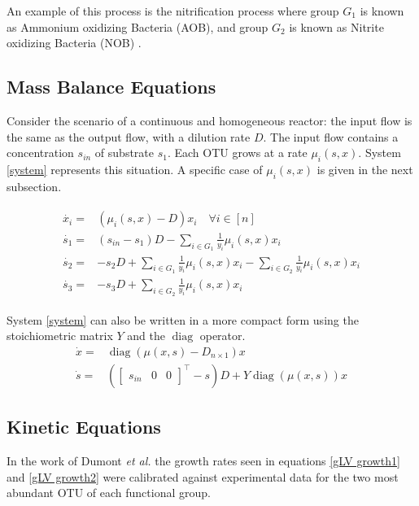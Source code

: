 \documentclass[3p,times]{article}
\DeclareMathOperator{\diag}{diag}
\begin{document}
An example of this process is the nitrification process where group $G_1$ is known as Ammonium oxidizing Bacteria (AOB), and group $G_2$ is known as Nitrite oxidizing Bacteria (NOB) \cite{SHARMA1977897}. 
\subsection{Mass Balance Equations}

Consider the scenario of a continuous and homogeneous reactor: the input flow is the same as the output flow, with a dilution rate $D$. The input flow contains a concentration $s_{in}$ of substrate $s_1$. Each OTU grows at a rate $\mu_i(s,x)$. System \eqref{system} represents this situation. A specific case of $\mu_i(s,x)$ is given in the next subsection. 

\begin{align} 
\label{system}
\begin{array}{cl}
\dot{x_i} =& \left(\mu_i(s,x) -D \right)x_i \quad \forall i \in [n] \\
\dot{s_1} =& \displaystyle (s_{in}-s_1)D - \sum\limits_{i\in G_1} \frac{1}{y_i} \mu_i(s,x) x_i  \\
\dot{s_2} = & \displaystyle -s_2D+\sum\limits_{i\in G_1} \frac{1}{y_i} \mu_i(s,x) x_i -\sum\limits_{i\in G_2} \frac{1}{y_i} \mu_i(s,x) x_i \\
\dot{s_3} =&  \displaystyle -s_3D+\sum\limits_{i\in G_2} \frac{1}{y_i} \mu_i(s,x) x_i  
\end{array}
\end{align}	

System \eqref{system} can also be written in a more compact form using the stoichiometric matrix $Y$ and the $\diag$ operator.
\begin{align}
\label{Eq1X}	\dot{x} = & \diag(\mu(x,s) - D_{n\times 1})x \\
\label{EqS}	\dot{s} = & \left(\begin{bmatrix} s_{in}&0&0 \end{bmatrix}^\top-s\right)D + Y\diag(\mu(x,s))x
\end{align} 

\subsection{Kinetic Equations}
In the work of Dumont \textit{et al.} \cite{Dumont2016} the growth rates seen in equations \eqref{gLV growth1} and \eqref{gLV growth2} were calibrated against experimental data for the two most abundant OTU of each functional group.
\end{document}
